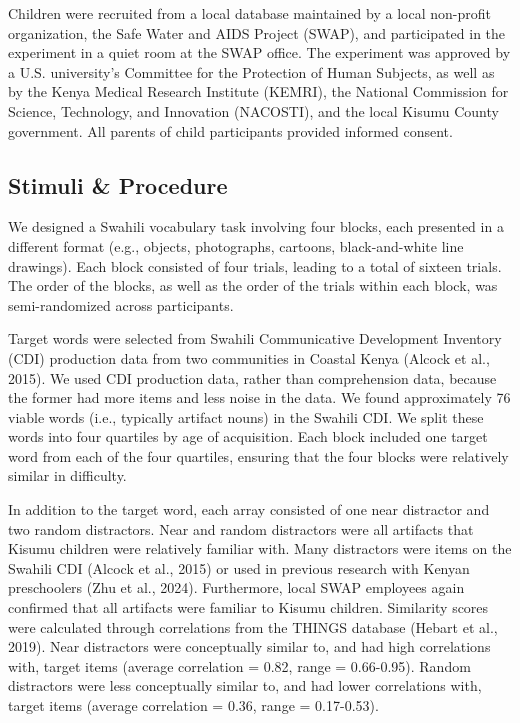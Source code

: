 \documentclass[10pt, letterpaper]{article}
\begin{document}
Children were recruited from a local database maintained by a local
non-profit organization, the Safe Water and AIDS Project (SWAP), and
participated in the experiment in a quiet room at the SWAP office. The
experiment was approved by a U.S. university's Committee for the
Protection of Human Subjects, as well as by the Kenya Medical Research
Institute (KEMRI), the National Commission for Science, Technology, and
Innovation (NACOSTI), and the local Kisumu County government. All
parents of child participants provided informed consent.

\subsection{Stimuli \& Procedure}\label{stimuli-procedure}

We designed a Swahili vocabulary task involving four blocks, each
presented in a different format (e.g., objects, photographs, cartoons,
black-and-white line drawings). Each block consisted of four trials,
leading to a total of sixteen trials. The order of the blocks, as well
as the order of the trials within each block, was semi-randomized across
participants.

Target words were selected from Swahili Communicative Development
Inventory (CDI) production data from two communities in Coastal Kenya
(Alcock et al., 2015). We used CDI production data, rather than
comprehension data, because the former had more items and less noise in
the data. We found approximately 76 viable words (i.e., typically
artifact nouns) in the Swahili CDI. We split these words into four
quartiles by age of acquisition. Each block included one target word
from each of the four quartiles, ensuring that the four blocks were
relatively similar in difficulty.

In addition to the target word, each array consisted of one near
distractor and two random distractors. Near and random distractors were
all artifacts that Kisumu children were relatively familiar with. Many
distractors were items on the Swahili CDI (Alcock et al., 2015) or used
in previous research with Kenyan preschoolers (Zhu et al., 2024).
Furthermore, local SWAP employees again confirmed that all artifacts
were familiar to Kisumu children. Similarity scores were calculated
through correlations from the THINGS database (Hebart et al., 2019).
Near distractors were conceptually similar to, and had high correlations
with, target items (average correlation = 0.82, range = 0.66-0.95).
Random distractors were less conceptually similar to, and had lower
correlations with, target items (average correlation = 0.36, range =
0.17-0.53).
\end{document}
